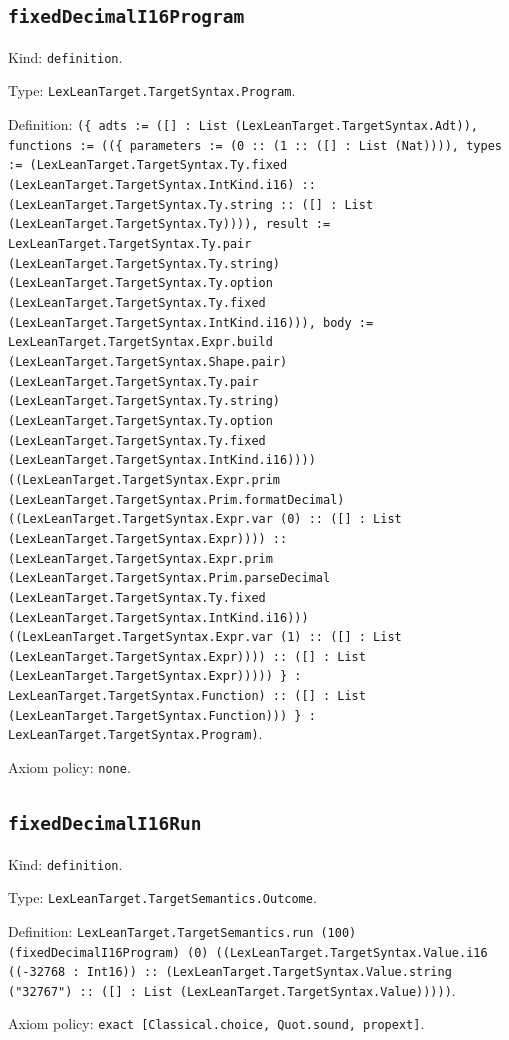 \documentclass[11pt]{article}
\begin{document}
\subsection*{\texttt{fixedDecimalI16Program}}
\noindent Kind: \texttt{definition}.\par
\noindent Type: \texttt{LexLeanTarget.TargetSyntax.Program}.\par
\noindent Definition: \texttt{(\{ adts := ([] : List (LexLeanTarget.TargetSyntax.Adt)), functions := ((\{ parameters := (0 :: (1 :: ([] : List (Nat)))), types := (LexLeanTarget.TargetSyntax.Ty.fixed (LexLeanTarget.TargetSyntax.IntKind.i16) :: (LexLeanTarget.TargetSyntax.Ty.string :: ([] : List (LexLeanTarget.TargetSyntax.Ty)))), result := LexLeanTarget.TargetSyntax.Ty.pair (LexLeanTarget.TargetSyntax.Ty.string) (LexLeanTarget.TargetSyntax.Ty.option (LexLeanTarget.TargetSyntax.Ty.fixed (LexLeanTarget.TargetSyntax.IntKind.i16))), body := LexLeanTarget.TargetSyntax.Expr.build (LexLeanTarget.TargetSyntax.Shape.pair) (LexLeanTarget.TargetSyntax.Ty.pair (LexLeanTarget.TargetSyntax.Ty.string) (LexLeanTarget.TargetSyntax.Ty.option (LexLeanTarget.TargetSyntax.Ty.fixed (LexLeanTarget.TargetSyntax.IntKind.i16)))) ((LexLeanTarget.TargetSyntax.Expr.prim (LexLeanTarget.TargetSyntax.Prim.formatDecimal) ((LexLeanTarget.TargetSyntax.Expr.var (0) :: ([] : List (LexLeanTarget.TargetSyntax.Expr)))) :: (LexLeanTarget.TargetSyntax.Expr.prim (LexLeanTarget.TargetSyntax.Prim.parseDecimal (LexLeanTarget.TargetSyntax.Ty.fixed (LexLeanTarget.TargetSyntax.IntKind.i16))) ((LexLeanTarget.TargetSyntax.Expr.var (1) :: ([] : List (LexLeanTarget.TargetSyntax.Expr)))) :: ([] : List (LexLeanTarget.TargetSyntax.Expr))))) \} : LexLeanTarget.TargetSyntax.Function) :: ([] : List (LexLeanTarget.TargetSyntax.Function))) \} : LexLeanTarget.TargetSyntax.Program)}.\par
\noindent Axiom policy: \texttt{none}.\par
\subsection*{\texttt{fixedDecimalI16Run}}
\noindent Kind: \texttt{definition}.\par
\noindent Type: \texttt{LexLeanTarget.TargetSemantics.Outcome}.\par
\noindent Definition: \texttt{LexLeanTarget.TargetSemantics.run (100) (fixedDecimalI16Program) (0) ((LexLeanTarget.TargetSyntax.Value.i16 ((-32768 : Int16)) :: (LexLeanTarget.TargetSyntax.Value.string ("32767") :: ([] : List (LexLeanTarget.TargetSyntax.Value)))))}.\par
\noindent Axiom policy: \texttt{exact [Classical.choice, Quot.sound, propext]}.\par
\end{document}
